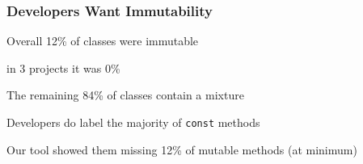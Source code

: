 \documentclass[aspectratio=169]{beamer}
\begin{document}
  \begin{frame}
    \frametitle{Developers Want Immutability}

    Overall 12\% of classes were immutable

    \hspace{1em} in 3 projects it was 0\%

    \vspace{1em}

    The remaining 84\% of classes contain a mixture

    \vspace{1em}


    \vspace{4em}

    Developers do label the majority of \texttt{const} methods

    \hspace{1em} Our tool showed them missing 12\% of mutable methods (at
                 minimum)

    \vspace{1em}

  \end{frame}
\end{document}
